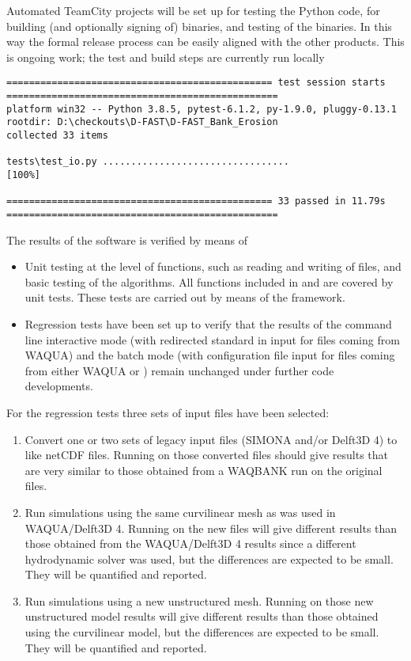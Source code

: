 Automated TeamCity projects will be set up for testing the Python code, for building (and optionally signing of) binaries, and testing of the binaries.
In this way the formal release process can be easily aligned with the other products.
This is ongoing work; the test and build steps are currently run locally

\begin{Verbatim}[fontsize=\tiny]
=============================================== test session starts ================================================
platform win32 -- Python 3.8.5, pytest-6.1.2, py-1.9.0, pluggy-0.13.1
rootdir: D:\checkouts\D-FAST\D-FAST_Bank_Erosion
collected 33 items

tests\test_io.py .................................                                                            [100%]

=============================================== 33 passed in 11.79s ================================================
\end{Verbatim}

The results of the software is verified by means of

\begin{itemize}
\item Unit testing at the level of functions, such as reading and writing of files, and basic testing of the algorithms.
All functions included in  and  are covered by unit tests.
These tests are carried out by means of the  framework.
\item Regression tests have been set up to verify that the results of the command line interactive mode (with redirected standard in input for files coming from WAQUA) and the batch mode (with configuration file input for files coming from either WAQUA or \dflowfm) remain unchanged under further code developments.
\end{itemize}

For the regression tests three sets of input files have been selected:

\begin{enumerate}
\item Convert one or two sets of legacy input files (SIMONA and/or Delft3D 4) to \dflowfm like netCDF files.
Running \dfastbe on those converted files should give results that are very similar to those obtained from a WAQBANK run on the original files.
\item Run \dflowfm simulations using the same curvilinear mesh as was used in WAQUA/Delft3D 4.
Running \dfastbe on the new files will give different results than those obtained from the WAQUA/Delft3D 4 results since a different hydrodynamic solver was used, but the differences are expected to be small.
They will be quantified and reported.
\item Run \dflowfm simulations using a new unstructured mesh.
Running \dfastbe on those new unstructured model results will give different results than those obtained using the curvilinear model, but the differences are expected to be small.
They will be quantified and reported.
\end{enumerate}

